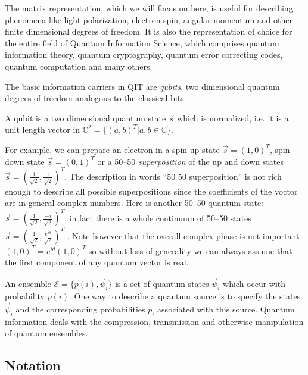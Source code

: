 \documentclass[aps,11pt,twoside,letterpaper]{article}
\def\c{\mathbb{C}}
\def\E{\mathcal{E}}
\begin{document}
	        The matrix representation, which we will focus on here,  is useful for describing 
	        phenomena like light polarization, electron spin, angular momentum and other 
	        finite dimensional degrees of freedom.
	        It is also the representation of choice for the entire field of Quantum Information Science,
	        which comprises quantum information theory, quantum cryptography, quantum error correcting codes, 
	        quantum computation and many others.

	        The basic information carriers in QIT are \emph{qubits}, two dimensional quantum degrees
	        of freedom analogous to the classical bits. 

	        \begin{definition}[qubit]
	            A qubit is a two dimensional quantum state $\vec{s}$ which is normalized, i.e.
	            it is a unit length vector in $\c^2 = \{(a,b)^T| a,b \in \c\}$.
	        \end{definition}

	        For example, we can prepare an electron in a spin up state $\vec{s}=(1,0)^T$,
	        spin down state $\vec{s}=(0,1)^T$ or a 50--50 \emph{superposition} of the up and down states
	        $\vec{s} = (\frac{1}{\sqrt{2}}, \frac{1}{\sqrt{2}})^T$.
	        The description in words ``50 50 superposition'' is not rich enough to describe all possible superpositions since
	        the coefficients of the voctor are in general complex numbers. 
	        Here is another 50--50 quantum state: $\vec{s} = (\frac{1}{\sqrt{2}}, \frac{-i}{\sqrt{2}})^T$, in fact there is a
	        whole continuum of 50--50  states $\vec{s} = (\frac{1}{\sqrt{2}}, \frac{e^{i\theta}}{\sqrt{2}})^T$ .
	        Note however that the overall complex phase is not important $(1,0)^T= e^{i\theta}(1,0)^T$ so without loss
	        of generality we can always assume that the first component of any quantum vector is real.

	        An ensemble $\E=\{p(i), \vec{\psi}_i \}$ is a set of quantum states $\vec{\psi}_i$ which occur with 
	        probability $p(i)$. 
	        One way to describe a quantum source is to specify the states $\vec{\psi}_i$ and the
	        corresponding probabilities $p_i$ associated with this source. 
	        Quantum information deals with the compression, transmission and otherwise manipulation
	        of quantum ensembles. 
        
	\subsection{Notation}
		
\end{document}
